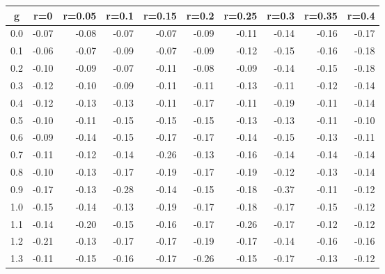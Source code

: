 %
\begin{table}[!tbp]
 \begin{center}
 \begin{tabular}{rrrrrrrrrr}\hline\hline
\multicolumn{1}{c}{g}&\multicolumn{1}{c}{r=0}&\multicolumn{1}{c}{r=0.05}&\multicolumn{1}{c}{r=0.1}&\multicolumn{1}{c}{r=0.15}&\multicolumn{1}{c}{r=0.2}&\multicolumn{1}{c}{r=0.25}&\multicolumn{1}{c}{r=0.3}&\multicolumn{1}{c}{r=0.35}&\multicolumn{1}{c}{r=0.4}\tabularnewline
\hline
0.0&-0.07&-0.08&-0.07&-0.07&-0.09&-0.11&-0.14&-0.16&-0.17\tabularnewline
0.1&-0.06&-0.07&-0.09&-0.07&-0.09&-0.12&-0.15&-0.16&-0.18\tabularnewline
0.2&-0.10&-0.09&-0.07&-0.11&-0.08&-0.09&-0.14&-0.15&-0.18\tabularnewline
0.3&-0.12&-0.10&-0.09&-0.11&-0.11&-0.13&-0.11&-0.12&-0.14\tabularnewline
0.4&-0.12&-0.13&-0.13&-0.11&-0.17&-0.11&-0.19&-0.11&-0.14\tabularnewline
0.5&-0.10&-0.11&-0.15&-0.15&-0.15&-0.13&-0.13&-0.11&-0.10\tabularnewline
0.6&-0.09&-0.14&-0.15&-0.17&-0.17&-0.14&-0.15&-0.13&-0.11\tabularnewline
0.7&-0.11&-0.12&-0.14&-0.26&-0.13&-0.16&-0.14&-0.14&-0.14\tabularnewline
0.8&-0.10&-0.13&-0.17&-0.19&-0.17&-0.19&-0.12&-0.13&-0.14\tabularnewline
0.9&-0.17&-0.13&-0.28&-0.14&-0.15&-0.18&-0.37&-0.11&-0.12\tabularnewline
1.0&-0.15&-0.14&-0.13&-0.19&-0.17&-0.18&-0.17&-0.15&-0.12\tabularnewline
1.1&-0.14&-0.20&-0.15&-0.16&-0.17&-0.26&-0.17&-0.12&-0.12\tabularnewline
1.2&-0.21&-0.13&-0.17&-0.17&-0.19&-0.17&-0.14&-0.16&-0.16\tabularnewline
1.3&-0.11&-0.15&-0.16&-0.17&-0.26&-0.15&-0.17&-0.13&-0.12\tabularnewline
\hline
\end{tabular}

\end{center}

\end{table}

